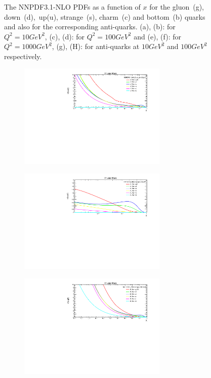 \begin{figure}[H]
\begin{subfigure}{0.45\textwidth}
\vspace*{-8mm}
\caption{}
\end{subfigure}
\caption{The NNPDF3.1-NLO PDFs as a function of $x$ for the gluon~(g), down~(d),~up(u), strange~(s), charm~(c) and bottom~(b) quarks and also for the corresponding anti-quarks. (a), (b): for $Q^{2}= 10GeV^{2}$, (c), (d): for $Q^{2}=100GeV^{2}$ and (e), (f): for $Q^{2}=1000GeV^{2}$, (g), (H): for anti-quarks at $10GeV^{2}$ and $100GeV^{2}$ respectively.} 
\label{nnpdf_nlo}
\end{figure}

\begin{figure}[H]
\centering
\begin{subfigure}{0.45\textwidth}
\includegraphics[height=5cm ,width=\textwidth]{chapter4/xfx10gev.pdf}
\vspace*{-8mm}
\caption{}
\end{subfigure}
\begin{subfigure}{0.45\textwidth}
\includegraphics[height=5cm, width=\textwidth]{chapter4/xfx10gev1.pdf}
\vspace*{-8mm}
\caption{}
\end{subfigure}
\begin{subfigure}{0.45\textwidth}
\includegraphics[height=5cm, width=\textwidth]{chapter4/xfx100gev.pdf}

\end{subfigure}
\end{figure}
